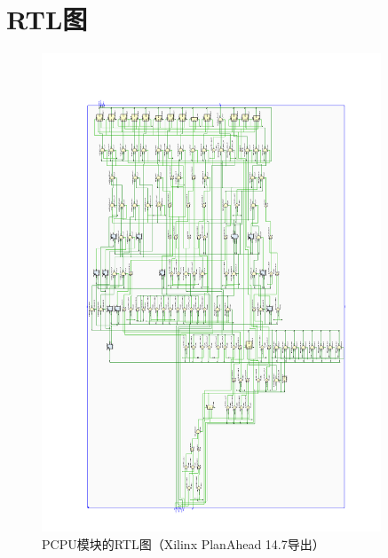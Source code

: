 \documentclass[10pt,a4paper,fleqn]{article}
\begin{document}
\section{RTL图}
\newpage
{}
\thispagestyle{empty}
\begin{figure}[H]
  \centering
  \includegraphics[width=0.9\textwidth]{figure/pcpu.pdf}
  \vspace{-0.8cm}
  \caption{PCPU模块的RTL图（Xilinx PlanAhead 14.7导出）}
\end{figure}
\newpage
\restoregeometry

\end{document}
